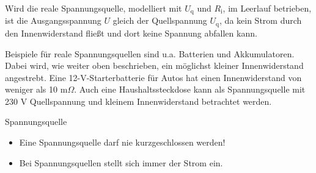 {    Wird die reale Spannungsquelle, modelliert mit $U_\mathrm{q}$ und $R_{\mathrm{i}}$, im Leerlauf betrieben, ist die Ausgangsspannung $U$ gleich der Quellspannung $U_\mathrm{q}$,
    da kein Strom durch den Innenwiderstand fließt und dort keine Spannung abfallen kann.

    Beispiele für reale Spannungsquellen sind u.a. Batterien und Akkumulatoren. Dabei wird, wie weiter oben beschrieben, ein möglichst kleiner Innenwiderstand angestrebt.
    Eine 12-V-Starterbatterie für Autos hat einen Innenwiderstand von weniger als 10 m$\Omega$.
    Auch eine Haushaltssteckdose kann als Spannungsquelle mit 230 V Quellspannung und kleinem Innenwiderstand betrachtet werden.
}

\begin{frame}

    \begin{Merksatz}{Spannungsquelle}
    \begin{itemize}
        \item Eine Spannungsquelle darf nie kurzgeschlossen werden!
        \item Bei Spannungsquellen stellt sich immer der Strom ein.
    \end{itemize}
    \end{Merksatz}


\end{frame}

